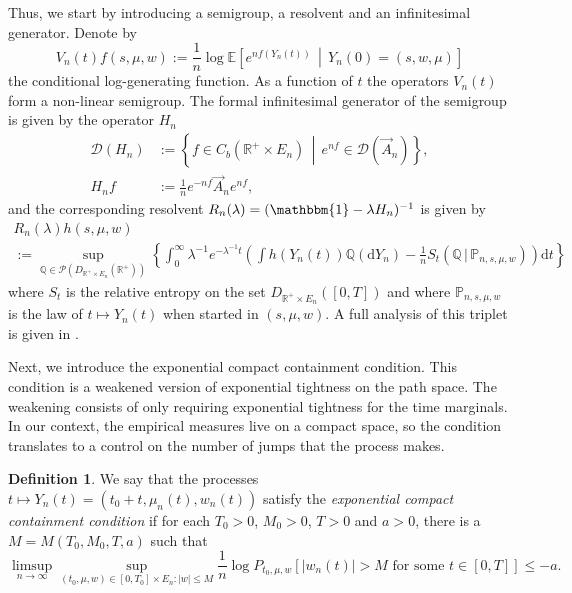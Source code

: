 \documentclass[a4paper]{article}
\newcommand{\cD}{\mathcal{D}}
\newcommand{\cP}{\mathcal{P}}
\newcommand{\bE}{\mathbb{E}}
\newcommand{\bQ}{\mathbb{Q}}
\newcommand{\bR}{\mathbb{R}}
\newcommand{\PR}{\mathbb{P}}
\newcommand{\bONE}{\mathbbm{1}}
\newcommand{\dd}{ \mathrm{d}}
\numberwithin{equation}{section}
\theoremstyle{definition}
\newtheorem{definition}[theorem]{Definition}
\begin{document}
Thus, we start by introducing a semigroup, a resolvent and an infinitesimal generator. Denote by
\begin{equation} \label{eqn:conditional_generating_function}
	V_n(t)f(s,\mu,w) := \frac{1}{n} \log \bE\left[e^{n f(Y_n(t))} \, \middle| \, Y_n(0) = (s,w,\mu) \right]
\end{equation}
the conditional log-generating function. As a function of $t$ the operators $V_n(t)$ form a non-linear semigroup. The formal infinitesimal generator of the semigroup is given by the operator $H_n$ 
\begin{equation} \label{eqn:defH_abstract}
	\begin{aligned}
		\cD(H_n) & := \left\{f \in C_b(\bR^+ \times E_n) \, \middle| \, e^{nf} \in \cD(\vec{A}_n) \right\}, \\
		H_n f & := \frac{1}{n} e^{-n f} \vec{A}_n e^{n f},
	\end{aligned}
\end{equation}
and the corresponding resolvent $R_n(\lambda) = (\bONE - \lambda H_n)^{-1}$ is given by 
\begin{multline*}
	R_n(\lambda)h(s,\mu,w) \\
	:= \sup_{\bQ \in \cP(D_{\bR^+ \times E_n}(\bR^+))} \left\{ \int_0^\infty \lambda^{-1} e^{-\lambda^{-1}t} \left( \int h(Y_n(t)) \bQ(\dd Y_n) - \frac{1}{n} S_t(\bQ \, | \, \PR_{n,s,\mu,w} ) \right) \dd t\right\} 
\end{multline*}
where $S_t$ is the relative entropy on the set $D_{\bR^+ \times E_n}([0,T])$ and where $\PR_{n,s,\mu,w}$ is the law of $t \mapsto Y_n(t)$ when started in $(s,\mu,w)$. A full analysis of this triplet is given in \cite{Kr19c}.

Next, we introduce the exponential compact containment condition. This condition is a weakened version of exponential tightness on the path space. The weakening consists of only requiring exponential tightness for the time marginals. In our context, the empirical measures live on a compact space, so the condition translates to a control on the number of jumps that the process makes.


\begin{definition}
	We say that the processes $t \mapsto Y_n(t) = (t_0 + t,\mu_n(t),w_n(t))$ satisfy the \textit{exponential compact containment condition} if for each $T_0 > 0$, $M_0 > 0$, $T > 0$ and $a > 0$, there is a $M = M(T_0,M_0,T,a)$ such that
	\begin{equation*}
		\limsup_{n \rightarrow \infty} \sup_{(t_0,\mu,w) \in [0,T_0] \times E_n: |w| \leq M} \frac{1}{n} \log P_{t_0,\mu,w}\left[|w_n(t)| > M \text{ for some } t \in [0,T] \right] \leq - a.
	\end{equation*}
\end{definition}
\end{document}
